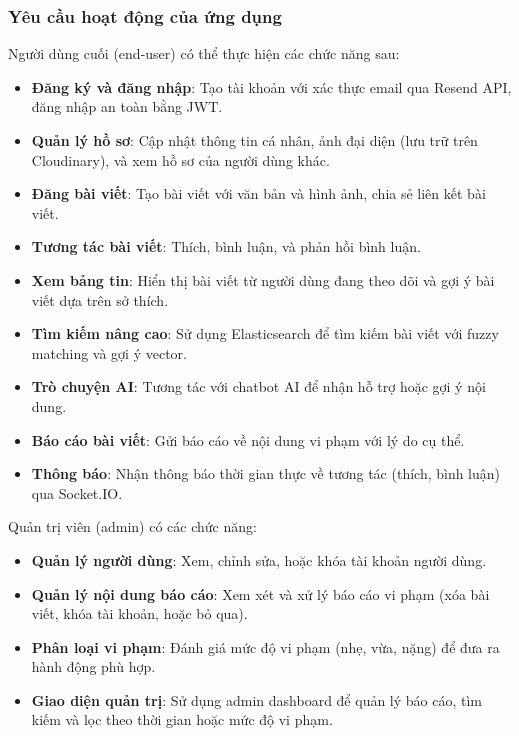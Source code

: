 \subsubsection{Yêu cầu hoạt động của ứng dụng}
Người dùng cuối (end-user) có thể thực hiện các chức năng sau:
\begin{itemize}
    \item \textbf{Đăng ký và đăng nhập}: Tạo tài khoản với xác thực email qua Resend API, đăng nhập an toàn bằng JWT.
    \item \textbf{Quản lý hồ sơ}: Cập nhật thông tin cá nhân, ảnh đại diện (lưu trữ trên Cloudinary), và xem hồ sơ của người dùng khác.
    \item \textbf{Đăng bài viết}: Tạo bài viết với văn bản và hình ảnh, chia sẻ liên kết bài viết.
    \item \textbf{Tương tác bài viết}: Thích, bình luận, và phản hồi bình luận.
    \item \textbf{Xem bảng tin}: Hiển thị bài viết từ người dùng đang theo dõi và gợi ý bài viết dựa trên sở thích.
    \item \textbf{Tìm kiếm nâng cao}: Sử dụng Elasticsearch để tìm kiếm bài viết với fuzzy matching và gợi ý vector.
    \item \textbf{Trò chuyện AI}: Tương tác với chatbot AI để nhận hỗ trợ hoặc gợi ý nội dung.
    \item \textbf{Báo cáo bài viết}: Gửi báo cáo về nội dung vi phạm với lý do cụ thể.
    \item \textbf{Thông báo}: Nhận thông báo thời gian thực về tương tác (thích, bình luận) qua Socket.IO.
\end{itemize}

Quản trị viên (admin) có các chức năng:
\begin{itemize}
    \item \textbf{Quản lý người dùng}: Xem, chỉnh sửa, hoặc khóa tài khoản người dùng.
    \item \textbf{Quản lý nội dung báo cáo}: Xem xét và xử lý báo cáo vi phạm (xóa bài viết, khóa tài khoản, hoặc bỏ qua).
    \item \textbf{Phân loại vi phạm}: Đánh giá mức độ vi phạm (nhẹ, vừa, nặng) để đưa ra hành động phù hợp.
    \item \textbf{Giao diện quản trị}: Sử dụng admin dashboard để quản lý báo cáo, tìm kiếm và lọc theo thời gian hoặc mức độ vi phạm.
\end{itemize}

